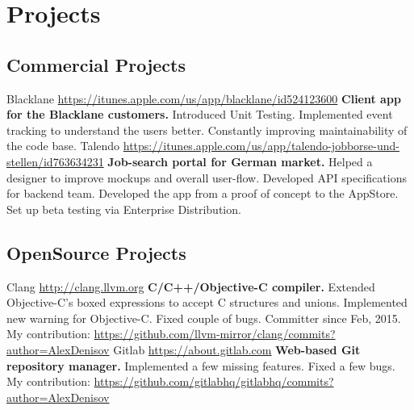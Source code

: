 \documentclass[11pt,a4paper]{moderncv}
\begin{document}
\maketitle

\section{Projects}
  \subsection{Commercial Projects}
  \cvline
    {Blacklane}
    {\url{https://itunes.apple.com/us/app/blacklane/id524123600}\newline{}
    \textbf{Client app for the Blacklane customers.}\newline{}
    Introduced Unit Testing.\newline{}
    Implemented event tracking to understand the users better.\newline{}
    Constantly improving maintainability of the code base.}
  \cvline
    {Talendo}
    {\url{https://itunes.apple.com/us/app/talendo-jobborse-und-stellen/id763634231}\newline{}
    \textbf{Job-search portal for German market.}\newline{}
    Helped a designer to improve mockups and overall user-flow.\newline{}
    Developed API specifications for backend team.\newline{}
    Developed the app from a proof of concept to the AppStore.\newline{}
    Set up beta testing via Enterprise Distribution.}
  \subsection{OpenSource Projects}
  \cvline
    {Clang}
    {\url{http://clang.llvm.org}\newline{}
    \textbf{C/C++/Objective-C compiler.}\newline{}
    Extended Objective-C's boxed expressions to accept C structures and unions.\newline{}
    Implemented new warning for Objective-C.\newline{}
    Fixed couple of bugs.\newline{}
    Committer since Feb, 2015.\newline{}
    My contribution:\newline{}
    \url{https://github.com/llvm-mirror/clang/commits?author=AlexDenisov}
    }
  \cvline
    {Gitlab}
    {\url{https://about.gitlab.com}\newline{}
    \textbf{Web-based Git repository manager.}\newline{}
    Implemented a few missing features.\newline{}
    Fixed a few bugs.\newline{}
    My contribution:\newline{}
    \url{https://github.com/gitlabhq/gitlabhq/commits?author=AlexDenisov}
    }
\end{document}
